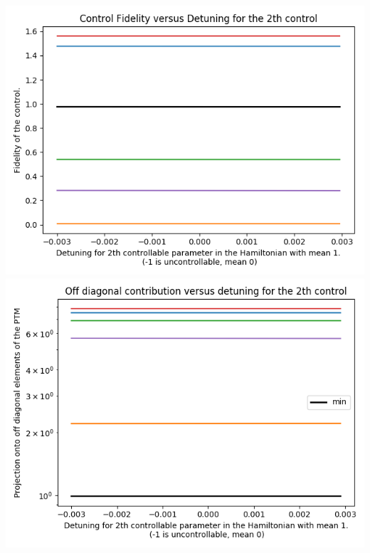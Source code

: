 \documentclass{article}
\begin{document}
\begin{center}
\includegraphics[scale=.9]{control_fid_3}
\includegraphics[scale=.9]{off_diag_3}

\end{center}
\end{document}
